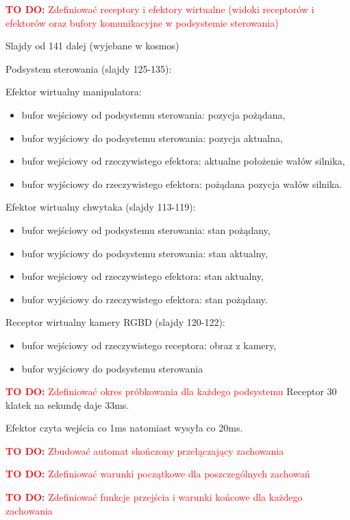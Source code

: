 \documentclass{article}
\newcommand{\todo}[1]{\textcolor{red}{\textbf{TO DO:} #1}}
\begin{document}
\todo{Zdefiniować receptory i efektory wirtualne (widoki receptorów
i efektorów oraz bufory komunikacyjne w podsystemie sterowania)}

Slajdy od 141 dalej (wyjebane w kosmos)

Podsystem sterowania (slajdy 125-135): 

Efektor wirtualny manipulatora:
\begin{itemize}
    \item bufor wejściowy od podsystemu sterowania: pozycja pożądana,
    \item bufor wyjściowy do podsystemu sterowania: pozycja aktualna,
    \item bufor wejściowy od rzeczywistego efektora: aktualne położenie wałów silnika,
    \item bufor wyjściowy do rzeczywistego efektora: pożądana pozycja wałów silnika.
\end{itemize}

Efektor wirtualny chwytaka (slajdy 113-119):
\begin{itemize}
    \item bufor wejściowy od podsystemu sterowania: stan pożądany,
    \item bufor wyjściowy do podsystemu sterowania: stan aktualny,
    \item bufor wejściowy od rzeczywistego efektora: stan aktualny,
    \item bufor wyjściowy do rzeczywistego efektora: stan pożądany.
\end{itemize}

Receptor wirtualny kamery RGBD (slajdy 120-122):
\begin{itemize}
    \item bufor wejściowy od rzeczywistego receptora: obraz z kamery,
    \item bufor wyjściowy do podsystemu sterowania
\end{itemize}

\todo{Zdefiniować okres próbkowania dla każdego podsystemu}
Receptor 30 klatek na sekundę daje 33ms.

Efektor czyta wejścia co 1ms natomiast wysyła co 20ms. 

\todo{Zbudować automat skończony przełączający zachowania}

\todo{Zdefiniować warunki początkowe dla poszczególnych zachowań}

\todo{Zdefiniować funkcje przejścia i warunki końcowe dla każdego
zachowania}




\end{document}
